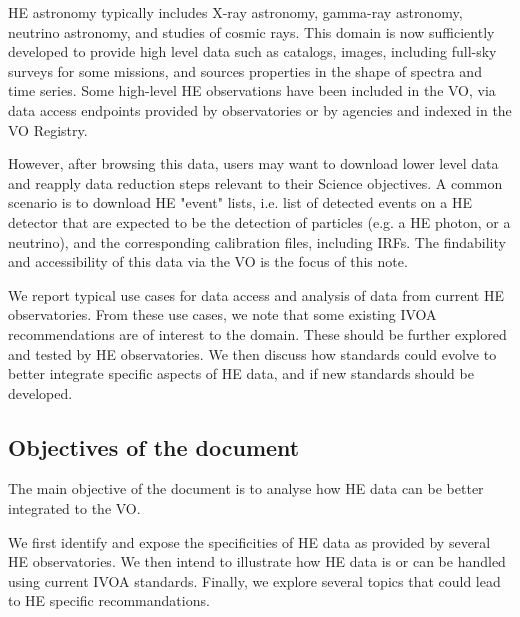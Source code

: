 \documentclass[11pt,a4paper]{ivoa}
\begin{document}

\gls{HE} astronomy typically includes X-ray astronomy, gamma-ray astronomy,
neutrino astronomy, and studies of cosmic rays. This domain is now sufficiently developed to provide high level data such as catalogs, images, including full-sky surveys for some missions, and sources properties in the shape of spectra and time series.
Some high-level \gls{HE} observations have been included in the \gls{VO}, via data access endpoints provided by observatories or by agencies and indexed in the \gls{VO} Registry.

However, after browsing this data, users may want to download lower level data and reapply data reduction steps relevant to their Science objectives. A common scenario is to download \gls{HE} "event" lists, i.e. list of detected events on a \gls{HE} detector that are expected to be the detection of particles (e.g. a \gls{HE} photon, or a neutrino), and the corresponding calibration files, including \gls{IRF}s. The findability and accessibility of this data via the \gls{VO} is the focus of this note.

We report typical use cases for data access and analysis of data from current \gls{HE} observatories. From these use
cases, we note that some existing \gls{IVOA} recommendations are of interest to the domain. These should be further explored and tested
by \gls{HE} observatories. We then discuss how standards could evolve to better integrate specific aspects of \gls{HE} data, and if
new standards should be developed.

\subsection{Objectives of the document}

The main objective of the document is to analyse how \gls{HE} data can be better integrated to the \gls{VO}.

We first identify and expose the specificities of \gls{HE} data as provided by several \gls{HE} observatories. We then intend to illustrate how \gls{HE} data is or can be handled using current \gls{IVOA} standards. Finally, we explore several topics that could lead to \gls{HE} specific recommandations.
\end{document}
